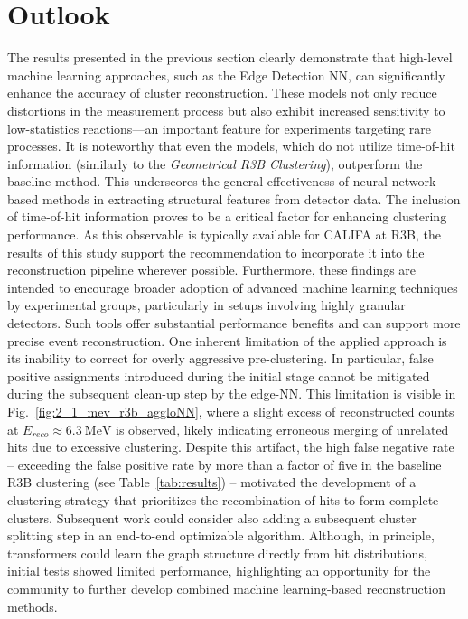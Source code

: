 \documentclass[final,5p,times,twocolumn]{elsarticle}
\begin{document}
\section{Outlook}\label{sec:disc_outlook}

The results presented in the previous section clearly demonstrate that high-level machine learning approaches, such as the Edge Detection NN, can significantly enhance the accuracy of cluster reconstruction. These models not only reduce distortions in the measurement process but also exhibit increased sensitivity to low-statistics reactions—an important feature for experiments targeting rare processes.\newline
It is noteworthy that even the models, which do not utilize time-of-hit information (similarly to the \textit{Geometrical R3B Clustering}), outperform the baseline method. This underscores the general effectiveness of neural network-based methods in extracting structural features from detector data.\newline
The inclusion of time-of-hit information proves to be a critical factor for enhancing clustering performance. As this observable is typically available for CALIFA at R3B, the results of this study support the recommendation to incorporate it into the reconstruction pipeline wherever possible.\newline
Furthermore, these findings are intended to encourage broader adoption of advanced machine learning techniques by experimental groups, particularly in setups involving highly granular detectors. Such tools offer substantial performance benefits and can support more precise event reconstruction.\newline
One inherent limitation of the applied approach is its inability to correct for overly aggressive pre-clustering. In particular, false positive assignments introduced during the initial stage cannot be mitigated during the subsequent clean-up step by the edge-NN. This limitation is visible in Fig.~\ref{fig:2_1_mev_r3b_aggloNN}, where a slight excess of reconstructed counts at \(E_{reco} \approx 6.3\ \mathrm{MeV}\) is observed, likely indicating erroneous merging of unrelated hits due to excessive clustering. Despite this artifact, the high false negative rate -- exceeding the false positive rate by more than a factor of five in the baseline R3B clustering (see Table~\ref{tab:results}) -- motivated the development of a clustering strategy that prioritizes the recombination of hits to form complete clusters.\newline
Subsequent work could consider also adding a subsequent cluster splitting step in an end-to-end optimizable algorithm. Although, in principle, transformers could learn the graph structure directly from hit distributions, initial tests showed limited performance, highlighting an opportunity for the community to further develop combined machine learning-based reconstruction methods.\newline
\end{document}
